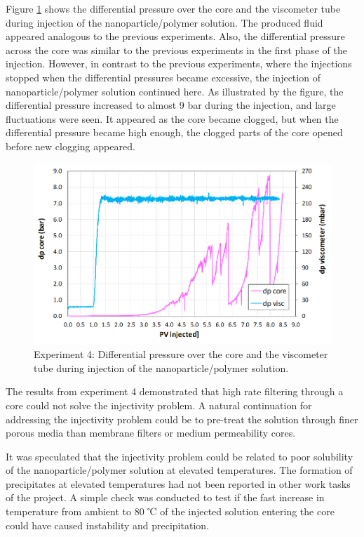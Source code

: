 Figure \ref{cht:gelexp4_1} shows the differential pressure over the core and the viscometer tube during injection of the nanoparticle/polymer solution. The produced fluid appeared analogous to the previous experiments. Also, the differential pressure across the core was similar to the previous experiments in the first phase of the injection. However, in contrast to the previous experiments, where the injections stopped when the differential pressures became excessive, the injection of nanoparticle/polymer solution continued here. As illustrated by the figure, the differential pressure increased to almost 9 bar during the injection, and large fluctuations were seen. It appeared as the core became clogged, but when the differential pressure became high enough, the clogged parts of the core opened before new clogging appeared.

\begin{figure}[h!]
    \centering
    \includegraphics[width=\textwidth]{img/cht/gelexp4_1.png}
    \caption{Experiment 4: Differential pressure over the core and the viscometer tube during injection of the nanoparticle/polymer solution.}
    \label{cht:gelexp4_1} %
\end{figure}

The results from experiment 4 demonstrated that high rate filtering through a core could not solve the injectivity problem. A natural continuation for addressing the injectivity problem could be to pre-treat the solution through finer porous media than membrane filters or medium permeability cores.

It was speculated that the injectivity problem could be related to poor solubility of the nanoparticle/polymer solution at elevated temperatures. The formation of precipitates at elevated temperatures had not been reported in other work tasks of the project. A simple check was conducted to test if the fast increase in temperature from ambient to 80 ℃ of the injected solution entering the core could have caused instability and precipitation.

